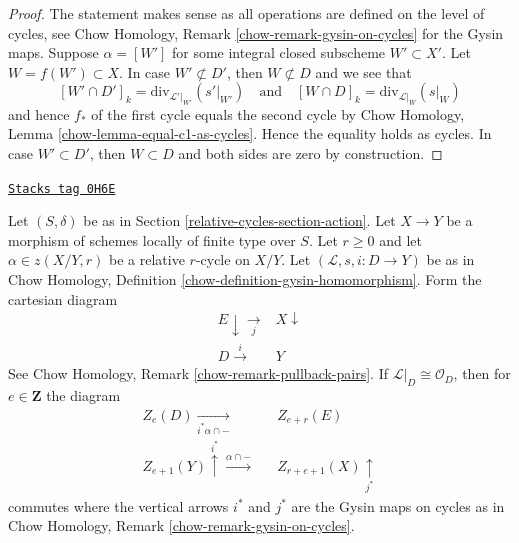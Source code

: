 \begin{proof}
The statement makes sense as all operations are defined on the level
of cycles, see Chow Homology, Remark \ref{chow-remark-gysin-on-cycles}
for the Gysin maps.
Suppose $\alpha = [W']$ for some integral closed subscheme
$W' \subset X'$. Let $W = f(W') \subset X$. In case $W' \not \subset D'$,
then $W \not \subset D$ and we see that
$$
[W' \cap D']_k = \text{div}_{\mathcal{L}'|_{W'}}({s'|_{W'}})
\quad\text{and}\quad
[W \cap D]_k = \text{div}_{\mathcal{L}|_W}(s|_W)
$$
and hence $f_*$ of the first cycle equals the second cycle by
Chow Homology, Lemma \ref{chow-lemma-equal-c1-as-cycles}. Hence the
equality holds as cycles. In case $W' \subset D'$, then
$W \subset D$ and both sides are zero by construction.
\end{proof}

\begin{lemma}
\label{relative-cycles-lemma-action-gysin}
\href{https://stacks.math.columbia.edu/tag/0H6E}{\texttt{Stacks tag 0H6E}}

Let $(S, \delta)$ be as in Section \ref{relative-cycles-section-action}.
Let $X \to Y$ be a morphism of schemes
locally of finite type over $S$. Let $r \geq 0$ and let
$\alpha \in z(X/Y, r)$ be a relative $r$-cycle on $X/Y$.
Let $(\mathcal{L}, s, i : D \to Y)$ be as in
Chow Homology, Definition \ref{chow-definition-gysin-homomorphism}.
Form the cartesian diagram
$$
\begin{array}{cc}E \downarrow\underset{j}{\longrightarrow} & X \downarrow \\ D \overset{i}{\longrightarrow} & Y\end{array}
$$
See Chow Homology, Remark \ref{chow-remark-pullback-pairs}.
If $\mathcal{L}|_D \cong \mathcal{O}_D$, then for $e \in \mathbf{Z}$
the diagram
$$
\begin{array}{ccc}Z_e(D) \underset{i^*\alpha \cap -}{\longrightarrow} &  & Z_{e + r}(E) \\ Z_{e + 1}(Y) \overset{i^*}{\uparrow}\overset{\alpha \cap -}{\longrightarrow} &  & Z_{r + e + 1}(X) \underset{j^*}{\uparrow}\end{array}
$$
commutes where the vertical arrows $i^*$ and $j^*$ are the
Gysin maps on cycles as in
Chow Homology, Remark \ref{chow-remark-gysin-on-cycles}.
\end{lemma}


